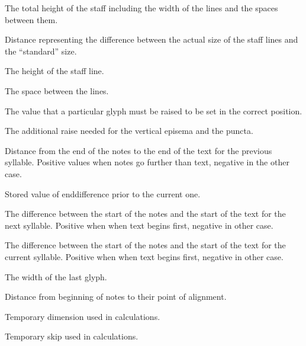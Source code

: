 The total height of the staff including the width of the lines and the spaces between them.

Distance representing the difference between the actual size of the staff lines and the ``standard'' size.

The height of the staff line.

The space between the lines.

The value that a particular glyph must be raised to be set in the correct position.

The additional raise needed for the vertical episema and the puncta.

Distance from the end of the notes to the end of the text for the previous syllable.  Positive values when notes go further than text, negative in the other case.

Stored value of enddifference prior to the current one.

The difference between the start of the notes and the start of the text for the next syllable.  Positive when when text begins first, negative in other case.

The difference between the start of the notes and the start of the text for the current syllable.  Positive when when text begins first, negative in other case.

The width of the last glyph.

Distance from beginning of notes to their point of alignment.

Temporary dimension used in calculations.

Temporary skip used in calculations.

